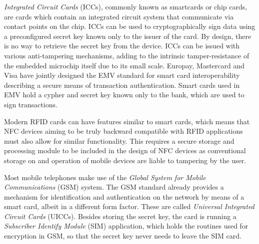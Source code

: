 
\textit{Integrated Circuit Cards} (ICCs), commonly known as smartcards or chip cards, are cards which contain an integrated circuit system that communicate via contact points on the chip.
ICCs can be used to cryptographically sign data using a preconfigured secret key known only to the issuer of the card. 
By design, there is no way to retrieve the secret key from the device.
ICCs can be issued with various anti-tampering mechanisms, adding to the intrinsic tamper-resistance of the embedded microchip itself due to its small scale. \cite{kömmerling1999design}
Europay, Mastercard and Visa have jointly designed the EMV standard for smart card interoperability describing a secure means of transaction authentication. %
Smart cards used in EMV hold a cypher and secret key known only to the bank, which are used to sign transactions.

Modern RFID cards can have features similar to smart cards, which means that NFC devices aiming to be truly backward compatible with RFID applications must also allow for similar functionality.
This requires a secure storage and processing module to be included in the design of NFC devices as conventional storage on and operation of mobile devices are liable to tampering by the user.

Most mobile telephones make use of the \textit{Global System for Mobile Communications} (GSM) system.
The GSM standard already provides a mechanism for identification and authentication on the network by means of a smart card, albeit in a different form factor.
These are called \textit{Universal Integrated Circuit Cards} (UICCs).
Besides storing the secret key, the card is running a \textit{Subscriber Identify Module} (SIM) application, which holds the routines used for encryption in GSM, so that the secret key never needs to leave the SIM card. %

